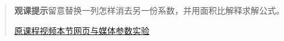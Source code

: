 \begin{quote}\small\textbf{观课提示}\quad 留意替换一列怎样消去另一份系数，并用面积比解释求解公式。

\href{https://www.youtube.com/watch?v=jBsC34PxzoM}{原课程视频}\quad\href{https://vitael04213.github.io/3blue1brown-notes/lessons/cramers-rule.html}{本节网页与媒体}\quad\href{https://vitael04213.github.io/3blue1brown-notes/lab.html\#linear}{参数实验}
\end{quote}
